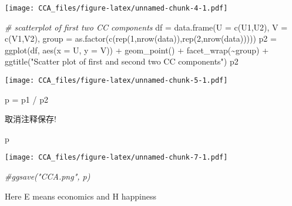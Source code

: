 \documentclass[
]{ctexart}
\newenvironment{Shaded}{\begin{snugshade}}{\end{snugshade}}
\newcommand{\AttributeTok}[1]{\textcolor[rgb]{0.77,0.63,0.00}{#1}}
\newcommand{\CommentTok}[1]{\textcolor[rgb]{0.56,0.35,0.01}{\textit{#1}}}
\newcommand{\DecValTok}[1]{\textcolor[rgb]{0.00,0.00,0.81}{#1}}
\newcommand{\FunctionTok}[1]{\textcolor[rgb]{0.00,0.00,0.00}{#1}}
\newcommand{\NormalTok}[1]{#1}
\newcommand{\OtherTok}[1]{\textcolor[rgb]{0.56,0.35,0.01}{#1}}
\newcommand{\SpecialCharTok}[1]{\textcolor[rgb]{0.00,0.00,0.00}{#1}}
\newcommand{\StringTok}[1]{\textcolor[rgb]{0.31,0.60,0.02}{#1}}
\begin{document}
\texttt{[image: CCA\_files/figure-latex/unnamed-chunk-4-1.pdf]}

\begin{Shaded}
\begin{Highlighting}[]
\CommentTok{\# scatterplot of first two CC components}
\NormalTok{df }\OtherTok{=} \FunctionTok{data.frame}\NormalTok{(}\AttributeTok{U =} \FunctionTok{c}\NormalTok{(U1,U2), }\AttributeTok{V =} \FunctionTok{c}\NormalTok{(V1,V2),}
                \AttributeTok{group =} \FunctionTok{as.factor}\NormalTok{(}\FunctionTok{c}\NormalTok{(}\FunctionTok{rep}\NormalTok{(}\DecValTok{1}\NormalTok{,}\FunctionTok{nrow}\NormalTok{(data)),}\FunctionTok{rep}\NormalTok{(}\DecValTok{2}\NormalTok{,}\FunctionTok{nrow}\NormalTok{(data)))))}
\NormalTok{p2 }\OtherTok{=} \FunctionTok{ggplot}\NormalTok{(df, }\FunctionTok{aes}\NormalTok{(}\AttributeTok{x =}\NormalTok{ U, }\AttributeTok{y =}\NormalTok{ V)) }\SpecialCharTok{+} \FunctionTok{geom\_point}\NormalTok{() }\SpecialCharTok{+} \FunctionTok{facet\_wrap}\NormalTok{(}\SpecialCharTok{\textasciitilde{}}\NormalTok{group) }\SpecialCharTok{+}
  \FunctionTok{ggtitle}\NormalTok{(}\StringTok{"Scatter plot of first and second two CC components"}\NormalTok{)}
\NormalTok{p2 }
\end{Highlighting}
\end{Shaded}

\texttt{[image: CCA\_files/figure-latex/unnamed-chunk-5-1.pdf]}

\begin{Shaded}
\begin{Highlighting}[]
\NormalTok{p }\OtherTok{=}\NormalTok{ p1 }\SpecialCharTok{/}\NormalTok{ p2}
\end{Highlighting}
\end{Shaded}

取消注释保存!

\begin{Shaded}
\begin{Highlighting}[]
\NormalTok{p}
\end{Highlighting}
\end{Shaded}

\texttt{[image: CCA\_files/figure-latex/unnamed-chunk-7-1.pdf]}

\begin{Shaded}
\begin{Highlighting}[]
\CommentTok{\#ggsave("CCA.png", p)}
\end{Highlighting}
\end{Shaded}

Here E means economics and H happiness
\end{document}
